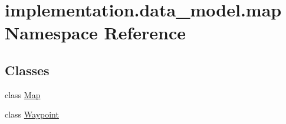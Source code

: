 \hypertarget{namespaceimplementation_1_1data__model_1_1map}{}\section{implementation.\+data\+\_\+model.\+map Namespace Reference}
\label{namespaceimplementation_1_1data__model_1_1map}
\subsection*{Classes}
\begin{DoxyCompactItemize}
\item 
class \hyperlink{classimplementation_1_1data__model_1_1map_1_1_map}{Map}
\item 
class \hyperlink{classimplementation_1_1data__model_1_1map_1_1_waypoint}{Waypoint}
\end{DoxyCompactItemize}
